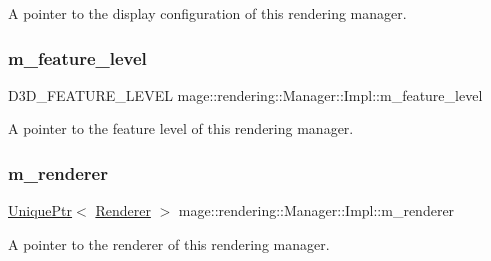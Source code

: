 A pointer to the display configuration of this rendering manager. \hypertarget{classmage_1_1rendering_1_1_manager_1_1_impl_afdf5967267574a49bba12f5478ba6325}{}\label{classmage_1_1rendering_1_1_manager_1_1_impl_afdf5967267574a49bba12f5478ba6325} 
\subsubsection{\texorpdfstring{m\+\_\+feature\+\_\+level}{m\_feature\_level}}
{\footnotesize\ttfamily D3\+D\+\_\+\+F\+E\+A\+T\+U\+R\+E\+\_\+\+L\+E\+V\+EL mage\+::rendering\+::\+Manager\+::\+Impl\+::m\+\_\+feature\+\_\+level\hspace{0.3cm}{\ttfamily [private]}}

A pointer to the feature level of this rendering manager. \hypertarget{classmage_1_1rendering_1_1_manager_1_1_impl_aa15b0df6ab64a8c03cd4aa23cb78adb4}{}\label{classmage_1_1rendering_1_1_manager_1_1_impl_aa15b0df6ab64a8c03cd4aa23cb78adb4} 
\subsubsection{\texorpdfstring{m\+\_\+renderer}{m\_renderer}}
{\footnotesize\ttfamily \hyperlink{namespacemage_a3316d7143a973e37adf1110f2e80ca31}{Unique\+Ptr}$<$ \hyperlink{classmage_1_1rendering_1_1_renderer}{Renderer} $>$ mage\+::rendering\+::\+Manager\+::\+Impl\+::m\+\_\+renderer\hspace{0.3cm}{\ttfamily [private]}}

A pointer to the renderer of this rendering manager. \hypertarget{classmage_1_1rendering_1_1_manager_1_1_impl_a3775faa73581e535e207155e4fa09846}{}\label{classmage_1_1rendering_1_1_manager_1_1_impl_a3775faa73581e535e207155e4fa09846} 

